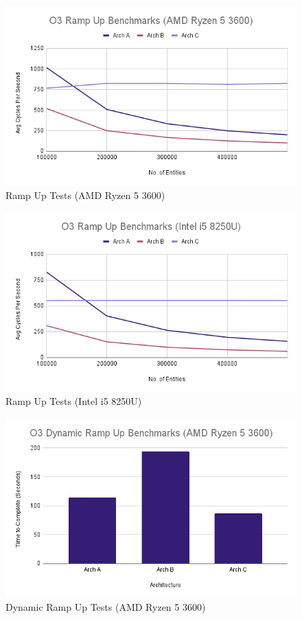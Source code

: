 \documentclass{article}
\begin{document}
\begin{figure}[!h]
\centering
\includegraphics[scale=0.5]{O3 Ramp Up Benchmarks (AMD Ryzen 5 3600).png}
\caption{Ramp Up Tests (AMD Ryzen 5 3600)}
\label{pc_ramp_up_tests}
\end{figure}

\begin{figure}[!h]
\centering
\includegraphics[scale=0.5]{O3 Ramp Up Benchmarks (Intel i5 8250U).png}
\caption{Ramp Up Tests (Intel i5 8250U)}
\label{laptop_ramp_up_tests}
\end{figure}

\begin{figure}[!h]
\centering
\includegraphics[scale=0.5]{O3 Dynamic Ramp Up Benchmarks (AMD Ryzen 5 3600).png}
\caption{Dynamic Ramp Up Tests (AMD Ryzen 5 3600)}
\label{pc_dynamic_ramp_up_tests}
\end{figure}
\end{document}
